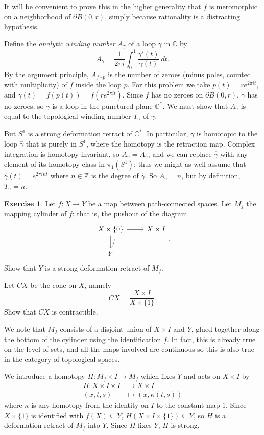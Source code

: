 \documentclass[10pt]{article}
\newcommand{\ZZ}{\mathbb{Z}}
\newcommand{\CC}{\mathbb{C}}
\theoremstyle{definition}
\newtheorem{exer}{Exercise}
\begin{document}
It will be convenient to prove this in the higher generality that $f$ is meromorphic on a neighborhood of $\partial B(0, r)$, simply because rationality is a distracting hypothesis.

Define the \emph{analytic winding number} $A_\gamma$ of a loop $\gamma$ in $\CC$ by
$$A_\gamma = \frac{1}{2\pi i} \int_0^1 \frac{\gamma'(t)}{\gamma(t)} ~dt.$$
By the argument principle, $A_{f \circ p}$ is the number of zeroes (minus poles, counted with multiplicity) of $f$ inside the loop $p$.
For this problem we take $p(t) = re^{2\pi it}$, and $\gamma(t) = f(p(t)) = f(re^{2\pi it})$.
Since $f$ has no zeroes on $\partial B(0, r)$, $\gamma$ has no zeroes, so $\gamma$ is a loop in the punctured plane $\CC^*$.
We must show that $A_\gamma$ is equal to the topological winding number $T_\gamma$ of $\gamma$.

But $S^1$ is a strong deformation retract of $\CC^*$.
In particular, $\gamma$ is homotopic to the loop $\hat \gamma$ that is purely in $S^1$, where the homotopy is the retraction map.
Complex integration is homotopy invariant, so $A_\gamma = A_{\hat \gamma}$, and we can replace $\hat \gamma$ with any element of its homotopy class in $\pi_1(S^1)$; thus we might as well assume that $\hat \gamma(t) = e^{2\pi int}$ where $n \in \ZZ$ is the degree of $\hat \gamma$.
So $A_\gamma = n$, but by definition, $T_\gamma = n$.

\begin{exer}
Let $f: X \to Y$ be a map between path-connected spaces. Let $M_f$ the mapping cylinder of $f$; that is, the pushout of the diagram
$$\begin{tikzcd}X \times \{0\} \arrow[r] \arrow[d,"f"] & X \times I\\ Y\end{tikzcd}.$$
Show that $Y$ is a strong deformation retract of $M_f$.

Let $CX$ be the cone on $X$, namely
$$CX = \frac{X \times I}{X \times \{1\}}.$$
Show that $CX$ is contractible.
\end{exer}

We note that $M_f$ consists of a disjoint union of $X \times I$ and $Y$, glued together along the bottom of the cylinder using the identification $f$.
In fact, this is already true on the level of sets, and all the maps involved are continuous so this is also true in the category of topological spaces.

We introduce a homotopy $H: M_f \times I \to M_f$ which fixes $Y$ and acts on $X \times I$ by
\begin{align*}
H: X \times I \times I &\to X \times I\\
(x, t, s) &\mapsto (x, \kappa(t, s))
\end{align*}
where $\kappa$ is any homotopy from the identity on $I$ to the constant map $1$.
Since $X \times \{1\}$ is identified with $f(X) \subseteq Y$, $H(X \times I \times \{1\}) \subseteq Y$, so $H$ is a deformation retract of $M_f$ into $Y$.
Since $H$ fixes $Y$, $H$ is strong.
\end{document}
